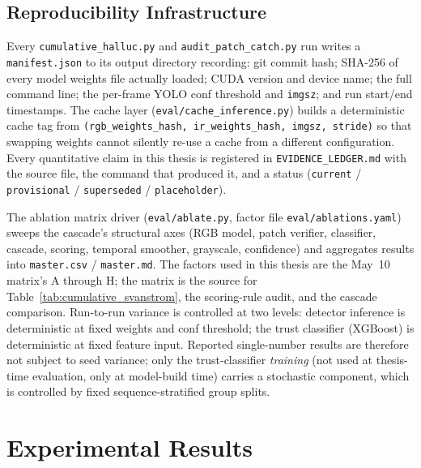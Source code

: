 \documentclass[12pt,a4paper,oneside,openright]{book}
\begin{document}
\section{Reproducibility Infrastructure}
\label{sec:reproducibility}

Every \texttt{cumulative\_halluc.py} and \texttt{audit\_patch\_catch.py} run writes a \texttt{manifest.json} to its output directory recording: git commit hash; SHA-256 of every model weights file actually loaded; CUDA version and device name; the full command line; the per-frame YOLO conf threshold and \texttt{imgsz}; and run start/end timestamps. The cache layer (\texttt{eval/cache\_inference.py}) builds a deterministic cache tag from \texttt{(rgb\_weights\_hash, ir\_weights\_hash, imgsz, stride)} so that swapping weights cannot silently re-use a cache from a different configuration. Every quantitative claim in this thesis is registered in \texttt{EVIDENCE\_LEDGER.md} with the source file, the command that produced it, and a status (\texttt{current} / \texttt{provisional} / \texttt{superseded} / \texttt{placeholder}).

The ablation matrix driver (\texttt{eval/ablate.py}, factor file \texttt{eval/ablations.yaml}) sweeps the cascade's structural axes (RGB model, patch verifier, classifier, cascade, scoring, temporal smoother, grayscale, confidence) and aggregates results into \texttt{master.csv} / \texttt{master.md}. The factors used in this thesis are the May~10 matrix's A through H; the matrix is the source for Table~\ref{tab:cumulative_svanstrom}, the scoring-rule audit, and the cascade comparison. Run-to-run variance is controlled at two levels: detector inference is deterministic at fixed weights and conf threshold; the trust classifier (XGBoost) is deterministic at fixed feature input. Reported single-number results are therefore not subject to seed variance; only the trust-classifier \emph{training} (not used at thesis-time evaluation, only at model-build time) carries a stochastic component, which is controlled by fixed sequence-stratified group splits.

\chapter{Experimental Results}
\label{ch:experiments}
\end{document}
